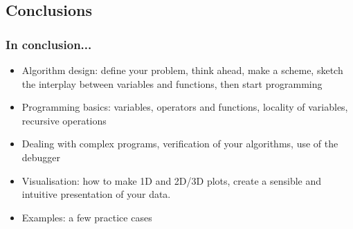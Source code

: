 \documentclass[11pt,table,final,fleqn,xcolor={usenames,dvipsnames},unknownkeysallowed]{beamer}
\begin{document}
\subsection*{Conclusions}
\begin{frame}[fragile]
  \frametitle{In conclusion...}
  \begin{itemize}
     \item Algorithm design: define your problem, think ahead, make a scheme, sketch the interplay between variables and functions, then start programming
     \item Programming basics: variables, operators and functions, locality of variables, recursive operations
     \item Dealing with complex programs, verification of your algorithms, use of the debugger
     \item Visualisation: how to make 1D and 2D/3D plots, create a sensible and intuitive presentation of your data.
     \item Examples: a few practice cases
  \end{itemize}
\end{frame}
\end{document}
